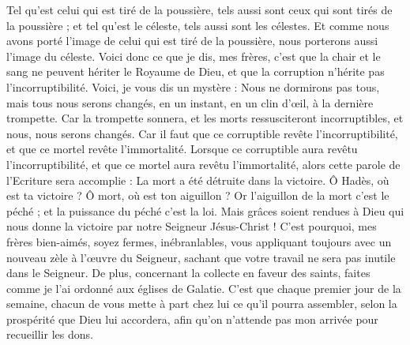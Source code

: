 \begin{multicols}{2}
Tel qu'est celui qui est tiré de la poussière, tels aussi sont ceux qui sont tirés de la poussière ; et tel qu'est le céleste, tels aussi sont les célestes.
Et comme nous avons porté l'image de celui qui est tiré de la poussière, nous porterons aussi l'image du céleste.
Voici donc ce que je dis, mes frères, c'est que la chair et le sang ne peuvent hériter le Royaume de Dieu, et que la corruption n'hérite pas l'incorruptibilité.
Voici, je vous dis un mystère : Nous ne dormirons pas tous, mais tous nous serons changés,
en un instant, en un clin d'œil, à la dernière trompette. Car la trompette sonnera, et les morts ressusciteront incorruptibles, et nous, nous serons changés.
Car il faut que ce corruptible revête l'incorruptibilité, et que ce mortel revête l'immortalité.
Lorsque ce corruptible aura revêtu l'incorruptibilité, et que ce mortel aura revêtu l'immortalité, alors cette parole de l'Ecriture sera accomplie : La mort a été détruite dans la victoire.
Ô Hadès, où est ta victoire ? Ô mort, où est ton aiguillon ?
Or l'aiguillon de la mort c'est le péché ; et la puissance du péché c'est la loi.
Mais grâces soient rendues à Dieu qui nous donne la victoire par notre Seigneur Jésus-Christ !
C'est pourquoi, mes frères bien-aimés, soyez fermes, inébranlables, vous appliquant toujours avec un nouveau zèle à l'œuvre du Seigneur, sachant que votre travail ne sera pas inutile dans le Seigneur.
\VerseOne{}De plus, concernant la collecte en faveur des saints, faites comme je l'ai ordonné aux églises de Galatie.
C'est que chaque premier jour de la semaine, chacun de vous mette à part chez lui ce qu'il pourra assembler, selon la prospérité que Dieu lui accordera, afin qu'on n'attende pas mon arrivée pour recueillir les dons.

\end{multicols}
